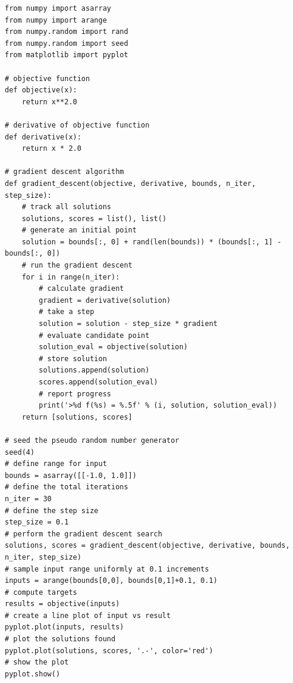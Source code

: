 \documentclass[%
oneside,                 %
final,                   %
10pt]{article}
\begin{document}
\begin{verbatim}
from numpy import asarray
from numpy import arange
from numpy.random import rand
from numpy.random import seed
from matplotlib import pyplot
 
# objective function
def objective(x):
	return x**2.0
 
# derivative of objective function
def derivative(x):
	return x * 2.0
 
# gradient descent algorithm
def gradient_descent(objective, derivative, bounds, n_iter, step_size):
	# track all solutions
	solutions, scores = list(), list()
	# generate an initial point
	solution = bounds[:, 0] + rand(len(bounds)) * (bounds[:, 1] - bounds[:, 0])
	# run the gradient descent
	for i in range(n_iter):
		# calculate gradient
		gradient = derivative(solution)
		# take a step
		solution = solution - step_size * gradient
		# evaluate candidate point
		solution_eval = objective(solution)
		# store solution
		solutions.append(solution)
		scores.append(solution_eval)
		# report progress
		print('>%d f(%s) = %.5f' % (i, solution, solution_eval))
	return [solutions, scores]
 
# seed the pseudo random number generator
seed(4)
# define range for input
bounds = asarray([[-1.0, 1.0]])
# define the total iterations
n_iter = 30
# define the step size
step_size = 0.1
# perform the gradient descent search
solutions, scores = gradient_descent(objective, derivative, bounds, n_iter, step_size)
# sample input range uniformly at 0.1 increments
inputs = arange(bounds[0,0], bounds[0,1]+0.1, 0.1)
# compute targets
results = objective(inputs)
# create a line plot of input vs result
pyplot.plot(inputs, results)
# plot the solutions found
pyplot.plot(solutions, scores, '.-', color='red')
# show the plot
pyplot.show()


\end{verbatim}


\end{document}
